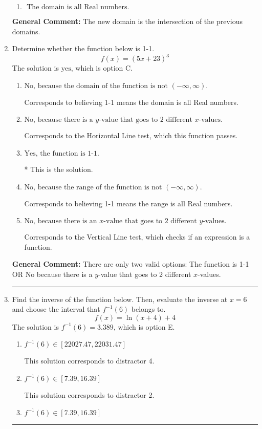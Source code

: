 \documentclass{extbook}[14pt]
\newcommand{\litem}[1]{\item #1

\rule{\textwidth}{0.4pt}}
\begin{document}
\begin{enumerate}
{\begin{enumerate}[label=\Alph*.]
\item \( \text{ The domain is all Real numbers. } \)


\end{enumerate}

\textbf{General Comment:} The new domain is the intersection of the previous domains.
}
\litem{
Determine whether the function below is 1-1.
\[ f(x) = (5 x + 23)^3 \]The solution is \( \text{yes} \), which is option C.\begin{enumerate}[label=\Alph*.]
\item \( \text{No, because the domain of the function is not $(-\infty, \infty)$.} \)

Corresponds to believing 1-1 means the domain is all Real numbers.
\item \( \text{No, because there is a $y$-value that goes to 2 different $x$-values.} \)

Corresponds to the Horizontal Line test, which this function passes.
\item \( \text{Yes, the function is 1-1.} \)

* This is the solution.
\item \( \text{No, because the range of the function is not $(-\infty, \infty)$.} \)

Corresponds to believing 1-1 means the range is all Real numbers.
\item \( \text{No, because there is an $x$-value that goes to 2 different $y$-values.} \)

Corresponds to the Vertical Line test, which checks if an expression is a function.
\end{enumerate}

\textbf{General Comment:} There are only two valid options: The function is 1-1 OR No because there is a $y$-value that goes to 2 different $x$-values.
}
\litem{
Find the inverse of the function below. Then, evaluate the inverse at $x = 6$ and choose the interval that $f^{-1}(6)$ belongs to.
\[ f(x) = \ln{(x+4)}+4 \]The solution is \( f^{-1}(6) = 3.389 \), which is option E.\begin{enumerate}[label=\Alph*.]
\item \( f^{-1}(6) \in [22027.47, 22031.47] \)

 This solution corresponds to distractor 4.
\item \( f^{-1}(6) \in [7.39, 16.39] \)

 This solution corresponds to distractor 2.
\item \( f^{-1}(6) \in [7.39, 16.39] \)


\end{enumerate}}
\end{enumerate}
\end{document}
